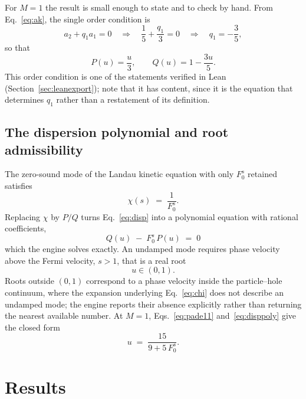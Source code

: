 \documentclass[11pt,a4paper]{article}
\newcommand{\Fzs}{F_0^{s}}
\begin{document}
For $M=1$ the result is small enough to state and to check by hand. From
Eq.~\eqref{eq:ak}, the single order condition is
\begin{equation}
  a_2 + q_1 a_1 = 0
  \quad\Longrightarrow\quad
  \frac15 + \frac{q_1}{3} = 0
  \quad\Longrightarrow\quad
  q_1 = -\frac35,
\end{equation}
so that
\begin{equation}
  P(u) = \frac{u}{3}, \qquad Q(u) = 1 - \frac{3u}{5}.
  \label{eq:pade11}
\end{equation}
This order condition is one of the statements verified in Lean
(Section~\ref{sec:leanexport}); note that it has content, since it is the
equation that determines $q_1$ rather than a restatement of its definition.

\subsection{The dispersion polynomial and root admissibility}

The zero-sound mode of the Landau kinetic equation with only $\Fzs$ retained
satisfies
\begin{equation}
  \chi(s) \;=\; \frac{1}{\Fzs}.
  \label{eq:disp}
\end{equation}
Replacing $\chi$ by $P/Q$ turns Eq.~\eqref{eq:disp} into a polynomial equation
with rational coefficients,
\begin{equation}
  \boxed{\;Q(u) \;-\; \Fzs\, P(u) \;=\; 0\;}
  \label{eq:disppoly}
\end{equation}
which the engine solves exactly. An undamped mode requires phase velocity above
the Fermi velocity, $s>1$, that is a real root
\begin{equation}
  u \in (0,1).
\end{equation}
Roots outside $(0,1)$ correspond to a phase velocity inside the particle--hole
continuum, where the expansion underlying Eq.~\eqref{eq:chi} does not describe
an undamped mode; the engine reports their absence explicitly rather than
returning the nearest available number. At $M=1$, Eqs.~\eqref{eq:pade11}
and~\eqref{eq:disppoly} give the closed form
\begin{equation}
  u \;=\; \frac{15}{9 + 5\,\Fzs}.
  \label{eq:rootformula}
\end{equation}

\section{Results}
\label{sec:results}
\end{document}
